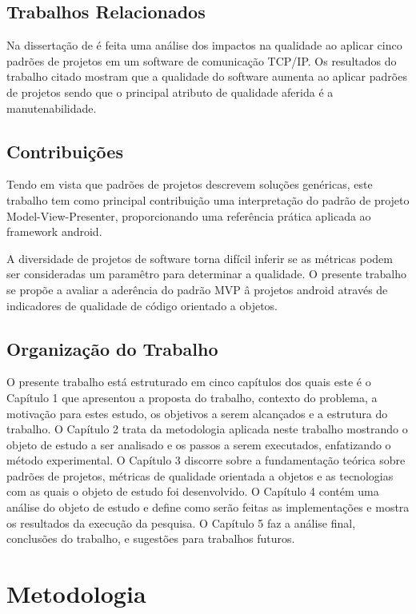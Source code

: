 \section{Trabalhos Relacionados}

Na dissertação de  é feita uma análise dos impactos na
qualidade ao aplicar cinco padrões de projetos em um software de comunicação
TCP/IP. Os resultados do trabalho citado mostram que a qualidade do software
aumenta ao aplicar padrões de projetos sendo que o principal atributo de
qualidade aferida é a manutenabilidade.


\section{Contribuições}


Tendo em vista que padrões de projetos descrevem soluções genéricas, este
trabalho tem como principal contribuição uma interpretação do padrão de projeto
Model-View-Presenter, proporcionando uma referência prática aplicada ao
framework android.

A diversidade de projetos de software torna difícil inferir se as métricas
podem ser consideradas um paramêtro para determinar a qualidade. O presente
trabalho  se propõe a avaliar a aderência do padrão MVP â projetos android
através de indicadores de qualidade de código orientado a objetos.

\section{Organização do Trabalho}

O presente trabalho está estruturado em cinco capítulos dos quais este é o
Capítulo 1 que apresentou a proposta do trabalho, contexto do problema, a
motivação para estes estudo, os objetivos a serem alcançados e a estrutura do
trabalho. 
O Capítulo 2 trata da metodologia aplicada neste trabalho mostrando o
objeto de estudo a ser analisado e os passos a serem executados, enfatizando o
método experimental.
O Capítulo 3 discorre sobre a fundamentação teórica sobre
padrões de projetos, métricas de qualidade orientada a objetos e as tecnologias com as quais o objeto
de estudo foi desenvolvido.
O Capítulo 4 contém uma análise do objeto de estudo e define como serão feitas
as implementações e mostra os resultados da execução da pesquisa.
O Capítulo 5 faz a análise final, conclusões do trabalho, e sugestões para
trabalhos futuros.


\chapter{Metodologia}

